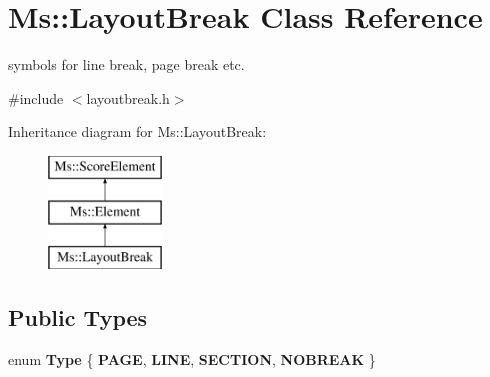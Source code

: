 \hypertarget{class_ms_1_1_layout_break}{}\section{Ms\+:\+:Layout\+Break Class Reference}
\label{class_ms_1_1_layout_break}


symbols for line break, page break etc.  




{\ttfamily \#include $<$layoutbreak.\+h$>$}

Inheritance diagram for Ms\+:\+:Layout\+Break\+:\begin{figure}[H]
\begin{center}
\leavevmode
\includegraphics[height=3.000000cm]{class_ms_1_1_layout_break}
\end{center}
\end{figure}
\subsection*{Public Types}
\begin{DoxyCompactItemize}
\item 
\mbox{\label{class_ms_1_1_layout_break_a6393fa4ac190bd6ccf42a7430de5f02f}} 
enum {\bfseries Type} \{ {\bfseries P\+A\+GE}, 
{\bfseries L\+I\+NE}, 
{\bfseries S\+E\+C\+T\+I\+ON}, 
{\bfseries N\+O\+B\+R\+E\+AK}
 \}
\end{DoxyCompactItemize}
